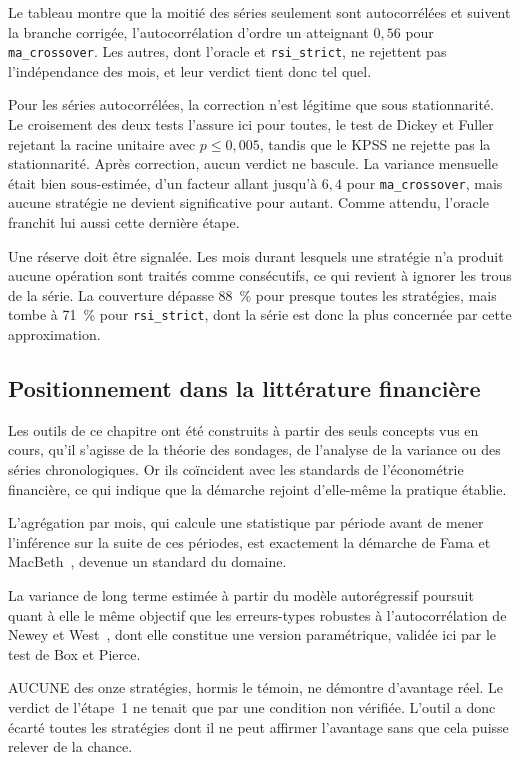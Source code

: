 Le tableau montre que la moitié des séries seulement sont autocorrélées et
suivent la branche corrigée, l'autocorrélation d'ordre un atteignant $0{,}56$
pour \texttt{ma\_crossover}. Les autres, dont l'oracle et \texttt{rsi\_strict},
ne rejettent pas l'indépendance des mois, et leur verdict tient donc tel quel.

Pour les séries autocorrélées, la correction n'est légitime que sous
stationnarité. Le croisement des deux tests l'assure ici pour toutes, le test
de Dickey et Fuller rejetant la racine unitaire avec $p \le 0{,}005$, tandis
que le KPSS ne rejette pas la stationnarité. Après correction, aucun verdict
ne bascule. La variance mensuelle était bien sous-estimée, d'un facteur allant
jusqu'à $6{,}4$ pour \texttt{ma\_crossover}, mais aucune stratégie ne devient
significative pour autant. Comme attendu, l'oracle franchit lui aussi cette
dernière étape.

Une réserve doit être signalée. Les mois durant lesquels une stratégie n'a
produit aucune opération sont traités comme consécutifs, ce qui revient à
ignorer les trous de la série. La couverture dépasse 88~\% pour presque toutes
les stratégies, mais tombe à 71~\% pour \texttt{rsi\_strict}, dont la série
est donc la plus concernée par cette approximation.



\subsection{Positionnement dans la littérature financière}
\label{sec:b1-positionnement}
Les outils de ce chapitre ont été construits à partir des seuls concepts vus
en cours, qu'il s'agisse de la théorie des sondages, de l'analyse de la
variance ou des séries chronologiques. Or ils coïncident avec les standards de
l'économétrie financière, ce qui indique que la démarche rejoint d'elle-même
la pratique établie.

L'agrégation par mois, qui calcule une statistique par période avant de mener
l'inférence sur la suite de ces périodes, est exactement la démarche de Fama
et MacBeth~\cite{famamacbeth1973}, devenue un standard du domaine.

La variance de long terme estimée à partir du modèle autorégressif poursuit
quant à elle le même objectif que les erreurs-types robustes à
l'autocorrélation de Newey et West~\cite{neweywest1987}, dont elle constitue
une version paramétrique, validée ici par le test de Box et Pierce.

AUCUNE des onze stratégies, hormis le témoin, ne
démontre d'avantage réel. Le verdict de l'étape~1 ne tenait que par
une condition non vérifiée. L'outil a donc écarté toutes les stratégies
dont il ne peut affirmer l'avantage sans que cela puisse relever de la chance.


